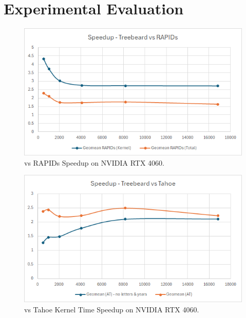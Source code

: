 \section{Experimental Evaluation}


\begin{figure}[htb]
  \centering
  \includegraphics[width=\linewidth]{figures/TBvsRAPIDs_4060_Speedup.png}
  \caption{\Treebeard{} vs RAPIDs Speedup on NVIDIA RTX 4060.}
  \label{Fig:TBvsRAPIDs_4060_Speedup}
\end{figure}

\begin{figure}[htb]
  \centering
  \includegraphics[width=\linewidth]{figures/TBvsTahoe_4060_KernelTimeSpeedup.png}
  \caption{\Treebeard{} vs Tahoe Kernel Time Speedup on NVIDIA RTX 4060.}
  \label{Fig:TBvsTahoe_4060_KernelTimeSpeedup}
\end{figure}

